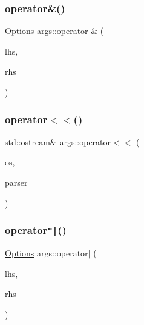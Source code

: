 \subsubsection{\texorpdfstring{operator\&()}{operator\&()}}
{\footnotesize\ttfamily \hyperlink{namespaceargs_aa530c0f95194aa275f49a5f299ac9e77}{Options} args\+::operator \& (\begin{DoxyParamCaption}\item[{\hyperlink{namespaceargs_aa530c0f95194aa275f49a5f299ac9e77}{Options}}]{lhs,  }\item[{\hyperlink{namespaceargs_aa530c0f95194aa275f49a5f299ac9e77}{Options}}]{rhs }\end{DoxyParamCaption})\hspace{0.3cm}{\ttfamily [inline]}}

\mbox{\label{namespaceargs_aa8ea7a3e7cbf85dc70ad2bfc2ff15fb4}} 
\subsubsection{\texorpdfstring{operator$<$$<$()}{operator<<()}}
{\footnotesize\ttfamily std\+::ostream\& args\+::operator$<$$<$ (\begin{DoxyParamCaption}\item[{std\+::ostream \&}]{os,  }\item[{const \hyperlink{classargs_1_1_argument_parser}{Argument\+Parser} \&}]{parser }\end{DoxyParamCaption})\hspace{0.3cm}{\ttfamily [inline]}}

\mbox{\label{namespaceargs_abaa8eef44af3abe206e0649f24f8be3c}} 
\subsubsection{\texorpdfstring{operator\texttt{"|}()}{operator|()}}
{\footnotesize\ttfamily \hyperlink{namespaceargs_aa530c0f95194aa275f49a5f299ac9e77}{Options} args\+::operator$\vert$ (\begin{DoxyParamCaption}\item[{\hyperlink{namespaceargs_aa530c0f95194aa275f49a5f299ac9e77}{Options}}]{lhs,  }\item[{\hyperlink{namespaceargs_aa530c0f95194aa275f49a5f299ac9e77}{Options}}]{rhs }\end{DoxyParamCaption})\hspace{0.3cm}{\ttfamily [inline]}}

